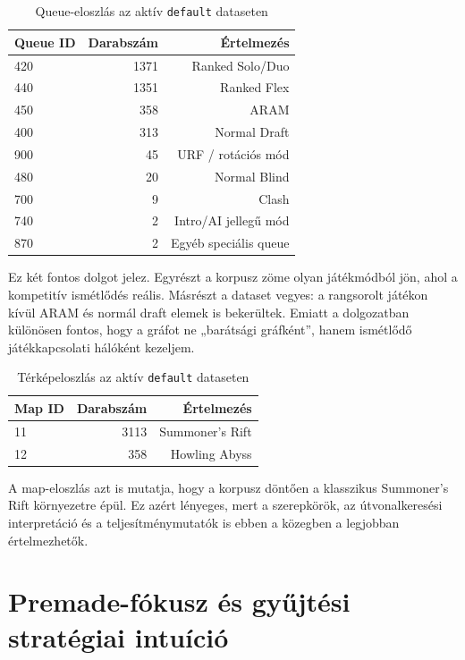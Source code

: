 ﻿\documentclass[a4paper,12pt]{report}
\begin{document}
\begin{table}[H]
\centering
\caption{Queue-eloszlás az aktív \texttt{default} dataseten}
\begin{tabular}{lrr}
\toprule
\textbf{Queue ID} & \textbf{Darabszám} & \textbf{Értelmezés} \\
\midrule
420 & 1371 & Ranked Solo/Duo \\
440 & 1351 & Ranked Flex \\
450 & 358 & ARAM \\
400 & 313 & Normal Draft \\
900 & 45 & URF / rotációs mód \\
480 & 20 & Normal Blind \\
700 & 9 & Clash \\
740 & 2 & Intro/AI jellegű mód \\
870 & 2 & Egyéb speciális queue \\
\bottomrule
\end{tabular}
\end{table}

Ez két fontos dolgot jelez. Egyrészt a korpusz zöme olyan játékmódból jön, ahol a kompetitív ismétlődés reális. Másrészt a dataset vegyes: a rangsorolt játékon kívül ARAM és normál draft elemek is bekerültek. Emiatt a dolgozatban különösen fontos, hogy a gráfot ne „barátsági gráfként”, hanem ismétlődő játékkapcsolati hálóként kezeljem.

\begin{table}[H]
\centering
\caption{Térképeloszlás az aktív \texttt{default} dataseten}
\begin{tabular}{lrr}
\toprule
\textbf{Map ID} & \textbf{Darabszám} & \textbf{Értelmezés} \\
\midrule
11 & 3113 & Summoner's Rift \\
12 & 358 & Howling Abyss \\
\bottomrule
\end{tabular}
\end{table}

A map-eloszlás azt is mutatja, hogy a korpusz döntően a klasszikus Summoner's Rift környezetre épül. Ez azért lényeges, mert a szerepkörök, az útvonalkeresési interpretáció és a teljesítménymutatók is ebben a közegben a legjobban értelmezhetők.

\section{Premade-fókusz és gyűjtési stratégiai intuíció}
\end{document}
